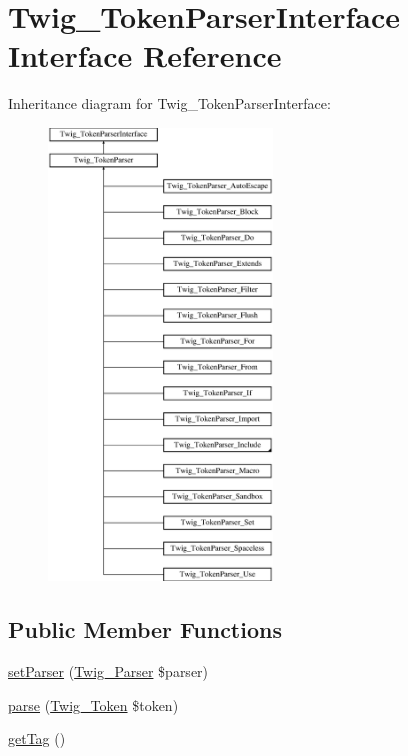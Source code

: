 \hypertarget{interface_twig___token_parser_interface}{}\section{Twig\+\_\+\+Token\+Parser\+Interface Interface Reference}
\label{interface_twig___token_parser_interface}
Inheritance diagram for Twig\+\_\+\+Token\+Parser\+Interface\+:\begin{figure}[H]
\begin{center}
\leavevmode
\includegraphics[height=12.000000cm]{interface_twig___token_parser_interface}
\end{center}
\end{figure}
\subsection*{Public Member Functions}
\begin{DoxyCompactItemize}
\item 
\hyperlink{interface_twig___token_parser_interface_a68fca2cbecd7ee6643879ae3d5c6f129}{set\+Parser} (\hyperlink{class_twig___parser}{Twig\+\_\+\+Parser} \$parser)
\item 
\hyperlink{interface_twig___token_parser_interface_a5dfa2e269321584fb74e8b43dabe0efd}{parse} (\hyperlink{class_twig___token}{Twig\+\_\+\+Token} \$token)
\item 
\hyperlink{interface_twig___token_parser_interface_ab86ba36154b20e6bbfa3ba705f12f9d6}{get\+Tag} ()
\end{DoxyCompactItemize}


